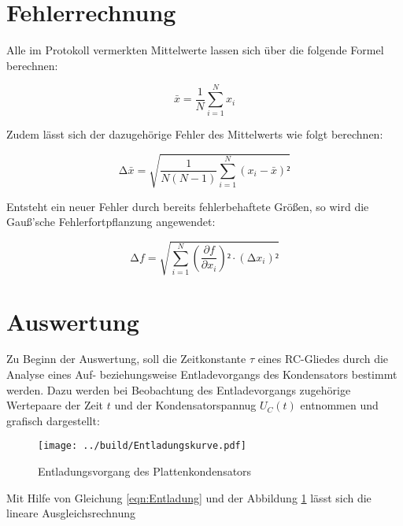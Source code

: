 



\section{Fehlerrechnung}
\label{sec:Fehlerrechnung}

Alle im Protokoll vermerkten Mittelwerte lassen sich über die folgende Formel berechnen:

\begin{equation}
\label{eqn:Mittelwert}
    \bar{x} = \frac{1}{N}\sum_{i=1}^N x_i
\end{equation}

\noindent Zudem lässt sich der dazugehörige Fehler des Mittelwerts wie folgt berechnen:

\begin{equation}
\label{eqn:Mittelwertfehler}
    \increment \bar{x} = \sqrt{\frac{1}{N\left(N-1\right)}\sum_{i=1}^N \left(x_i - \bar{x}\right)²}
\end{equation}

\noindent Entsteht ein neuer Fehler durch bereits fehlerbehaftete Größen, so wird die Gauß'sche Fehlerfortpflanzung angewendet:

\begin{equation}
\label{eqn:Fehlerfortpflanzung}
    \increment f = \sqrt{\sum_{i=1}^N \left(\frac{\partial f}{\partial x_i}\right)²\cdot\left(\increment x_i\right)²}
\end{equation}


\section{Auswertung}
\label{sec:Auswertung}

Zu Beginn der Auswertung, soll die Zeitkonstante $\tau$ eines RC-Gliedes durch die Analyse eines Auf- beziehungsweise Entladevorgangs
des Kondensators bestimmt werden. Dazu werden bei Beobachtung des Entladevorgangs zugehörige Wertepaare der Zeit $t$ und der Kondensatorspannug $U_C(t)$
entnommen und grafisch dargestellt: 

\begin{figure}[H]
    \centering
    \texttt{[image: ../build/Entladungskurve.pdf]}
    \label{fig:Entladungskurve}
    \caption{Entladungsvorgang des Plattenkondensators}
\end{figure}

\noindent Mit Hilfe von Gleichung \eqref{eqn:Entladung} und der Abbildung \ref{fig:Entladungskurve} lässt sich die lineare Ausgleichsrechnung 

